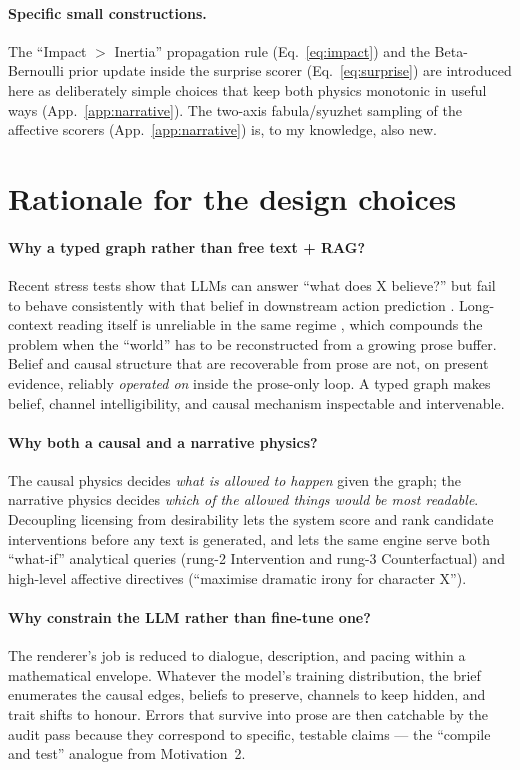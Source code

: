 \documentclass[11pt]{article}
\begin{document}
\paragraph{Specific small constructions.} The
``Impact $>$ Inertia'' propagation rule (Eq.~\ref{eq:impact}) and
the Beta-Bernoulli prior update inside the surprise scorer
(Eq.~\ref{eq:surprise}) are introduced here as deliberately simple
choices that keep both physics monotonic in useful ways
(App.~\ref{app:narrative}). The two-axis fabula/syuzhet sampling
of the affective scorers (App.~\ref{app:narrative}) is, to my
knowledge, also new.


\section{Rationale for the design choices}
\label{sec:rationale}

\paragraph{Why a typed graph rather than free text + RAG?}
Recent stress tests show that LLMs can answer ``what does X
believe?'' but fail to behave consistently with that belief in
downstream action prediction \citep{gu2026simpletom,kim2023fantom}.
Long-context reading itself is unreliable in the same regime
\citep{liu2024lost}, which compounds the problem when the
``world'' has to be reconstructed from a growing prose buffer.
Belief and causal structure that are recoverable from prose are
not, on present evidence, reliably \emph{operated on} inside the
prose-only loop. A typed graph makes belief, channel
intelligibility, and causal mechanism inspectable and
intervenable.

\paragraph{Why both a causal and a narrative physics?}
The causal physics decides \emph{what is allowed to happen} given
the graph; the narrative physics decides \emph{which of the allowed
things would be most readable}. Decoupling licensing from
desirability lets the system score and rank candidate
interventions before any text is generated, and lets the same
engine serve both ``what-if'' analytical queries (rung-2 Intervention
and rung-3 Counterfactual) and
high-level affective directives (``maximise dramatic irony for
character X'').

\paragraph{Why constrain the LLM rather than fine-tune one?}
The renderer's job is reduced to dialogue, description, and
pacing within a mathematical envelope. Whatever the model's
training distribution, the brief enumerates the causal edges,
beliefs to preserve, channels to keep hidden, and trait shifts
to honour. Errors that survive into prose are then catchable by
the audit pass because they correspond to specific, testable
claims --- the ``compile and test'' analogue from
Motivation~2.
\end{document}
